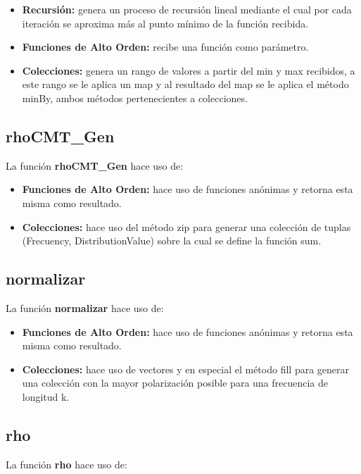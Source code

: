 \documentclass{article}
\begin{document}
    \begin{itemize}
      \item \textbf{Recursión:} genera un proceso de recursión lineal mediante el cual por cada iteración se aproxima más al punto mínimo de la función recibida.
      \item \textbf{Funciones de Alto Orden:} recibe una función como parámetro.
      \item \textbf{Colecciones:} genera un rango de valores a partir del min y max recibidos, a este rango se le aplica un map y al resultado del map se le aplica el método minBy, ambos métodos pertenecientes a colecciones.
    \end{itemize}

    \subsection{rhoCMT\_Gen}
    La función \textbf{rhoCMT\_Gen} hace uso de:

    \begin{itemize}
      \item \textbf{Funciones de Alto Orden:} hace uso de funciones anónimas y retorna esta misma como resultado.
      \item \textbf{Colecciones:} hace uso del método zip para generar una colección de tuplas (Frecuency, DistributionValue) sobre la cual se define la función sum.
    \end{itemize}

    \subsection{normalizar}
    La función \textbf{normalizar} hace uso de:

    \begin{itemize}
      \item \textbf{Funciones de Alto Orden:} hace uso de funciones anónimas y retorna esta misma como resultado.
      \item \textbf{Colecciones:} hace uso de vectores y en especial el método fill para generar una colección con la mayor polarización posible para una frecuencia de longitud k.
    \end{itemize}

    \subsection{rho}
    La función \textbf{rho} hace uso de:
\end{document}
